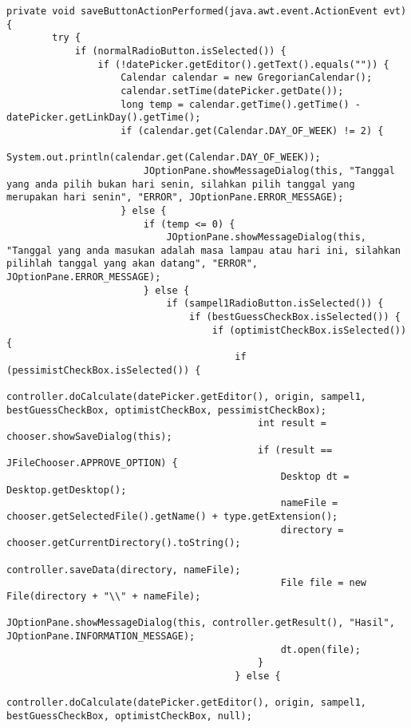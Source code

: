 \begin{lstlisting}[caption= main.java]
    private void saveButtonActionPerformed(java.awt.event.ActionEvent evt) {                                           
        try {
            if (normalRadioButton.isSelected()) {
                if (!datePicker.getEditor().getText().equals("")) {
                    Calendar calendar = new GregorianCalendar();
                    calendar.setTime(datePicker.getDate());
                    long temp = calendar.getTime().getTime() - datePicker.getLinkDay().getTime();
                    if (calendar.get(Calendar.DAY_OF_WEEK) != 2) {
                        System.out.println(calendar.get(Calendar.DAY_OF_WEEK));
                        JOptionPane.showMessageDialog(this, "Tanggal yang anda pilih bukan hari senin, silahkan pilih tanggal yang merupakan hari senin", "ERROR", JOptionPane.ERROR_MESSAGE);
                    } else {
                        if (temp <= 0) {
                            JOptionPane.showMessageDialog(this, "Tanggal yang anda masukan adalah masa lampau atau hari ini, silahkan pilihlah tanggal yang akan datang", "ERROR", JOptionPane.ERROR_MESSAGE);
                        } else {
                            if (sampel1RadioButton.isSelected()) {
                                if (bestGuessCheckBox.isSelected()) {
                                    if (optimistCheckBox.isSelected()) {
                                        if (pessimistCheckBox.isSelected()) {
                                            controller.doCalculate(datePicker.getEditor(), origin, sampel1, bestGuessCheckBox, optimistCheckBox, pessimistCheckBox);
                                            int result = chooser.showSaveDialog(this);
                                            if (result == JFileChooser.APPROVE_OPTION) {
                                                Desktop dt = Desktop.getDesktop();
                                                nameFile = chooser.getSelectedFile().getName() + type.getExtension();
                                                directory = chooser.getCurrentDirectory().toString();
                                                controller.saveData(directory, nameFile);
                                                File file = new File(directory + "\\" + nameFile);
                                                JOptionPane.showMessageDialog(this, controller.getResult(), "Hasil", JOptionPane.INFORMATION_MESSAGE);
                                                dt.open(file);
                                            }
                                        } else {
                                            controller.doCalculate(datePicker.getEditor(), origin, sampel1, bestGuessCheckBox, optimistCheckBox, null);

\end{lstlisting}
